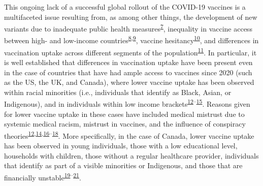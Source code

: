 \documentclass[
  letterpaper,
  DIV=11,
  numbers=noendperiod]{scrartcl}
\begin{document}
This ongoing lack of a successful global rollout of the COVID-19
vaccines is a multifaceted issue resulting from, as among other things,
the development of new variants due to inadequate public health
measures\textsuperscript{\protect\hyperlink{ref-li2021}{7}}, inequality
in vaccine access between high- and low-income
countries\textsuperscript{\protect\hyperlink{ref-gerretsen2021}{8},\protect\hyperlink{ref-tamey2022}{9}},
vaccine
hesitancy\textsuperscript{\protect\hyperlink{ref-nafilyan2021}{10}}, and
differences in vaccination uptake across different segments of the
population\textsuperscript{\protect\hyperlink{ref-malik2020}{11}}. In
particular, it is well established that differences in vaccination
uptake have been present even in the case of countries that have had
ample access to vaccines since 2020 (such as the US, the UK, and
Canada), where lower vaccine uptake has been observed within racial
minorities (i.e., individuals that identify as Black, Asian, or
Indigenous), and in individuals within low income
brackets\textsuperscript{\protect\hyperlink{ref-willis2021}{12}--\protect\hyperlink{ref-khubchandani2021}{15}}.
Reasons given for lower vaccine uptake in these cases have included
medical mistrust due to systemic medical racism, mistrust in vaccines,
and the influence of conspiracy
theories\textsuperscript{\protect\hyperlink{ref-willis2021}{12},\protect\hyperlink{ref-stoler2021}{14},\protect\hyperlink{ref-bogart2021}{16}--\protect\hyperlink{ref-freeman2020}{18}}.
More specifically, in the case of Canada, lower vaccine uptake has been
observed in young individuals, those with a low educational level,
households with children, those without a regular healthcare provider,
individuals that identify as part of a visible minorities or Indigenous,
and those that are financially
unstable\textsuperscript{\protect\hyperlink{ref-guay2022}{19}--\protect\hyperlink{ref-hussain2022}{21}}.
\end{document}
